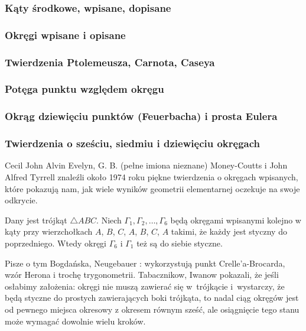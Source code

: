 \subsubsection{Kąty środkowe, wpisane, dopisane}


\subsubsection{Okręgi wpisane i opisane}


\subsubsection{Twierdzenia Ptolemeusza, Carnota, Caseya}


\subsubsection{Potęga punktu względem okręgu}


\subsubsection{Okrąg dziewięciu punktów (Feuerbacha) i prosta Eulera}


\subsubsection{Twierdzenia o sześciu, siedmiu i dziewięciu okręgach}
\label{sssection_6_7_9_circles}
Cecil John Alvin Evelyn, G. B. (pełne imiona nieznane) Money-Coutts i John Alfred Tyrrell znaleźli około 1974 roku piękne twierdzenia o okręgach wpisanych, które pokazują nam, jak wiele wyników geometrii elementarnej oczekuje na swoje odkrycie.

\begin{proposition}
	Dany jest trójkąt $\triangle ABC$.
	Niech $\Gamma_1, \Gamma_2, \ldots, \Gamma_6$ będą okręgami wpisanymi kolejno w kąty przy wierzchołkach $A$, $B$, $C$, $A$, $B$, $C$, $A$ takimi, że każdy jest styczny do poprzedniego.
	Wtedy okręgi $\Gamma_6$ i $\Gamma_1$ też są do siebie styczne.
\end{proposition}

Pisze o tym Bogdańska, Neugebauer \cite[s. 101]{neugebauer_2018}: wykorzystują punkt Crelle'a-Brocarda, wzór Herona i trochę trygonometrii.
Tabacznikow, Iwanow \cite{ivanov_tabachnikov_2016} pokazali, że jeśli osłabimy założenia: okręgi nie muszą zawierać się w~trójkącie i~wystarczy, że będą styczne do prostych zawierających boki trójkąta, to nadal ciąg okręgów jest od pewnego miejsca okresowy z okresem równym sześć, ale osiągnięcie tego stanu może wymagać dowolnie wielu kroków.
%
%

